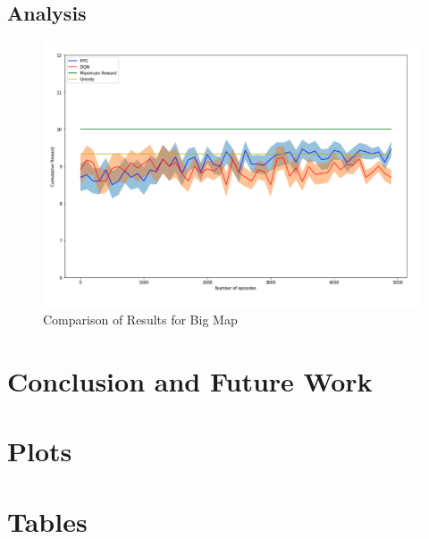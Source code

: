 \documentclass[12pt]{report}
\begin{document}
\section{Analysis} \label{Analysis}

\begin{figure}[!h]
    \centering
    \includegraphics[width=12cm]{30.png}
    \caption{Comparison of Results for Big Map}
    \label{fig:DQNSmallMapLearningMaps}
\end{figure}

\chapter{Conclusion and Future Work}
\appendix
\chapter{Plots}
\chapter{Tables}




      
\end{document}
